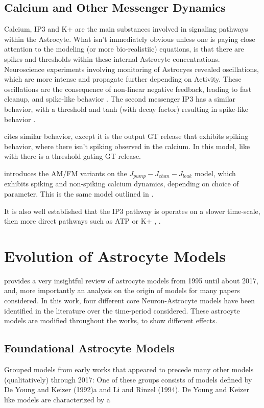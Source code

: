     \subsection{Calcium and Other Messenger Dynamics}
    Calcium, IP3 and K+ are the main substances involved in signaling pathways
    within the Astrocyte. What isn't immediately obvious unless one is paying
    close attention to the modeling (or more bio-realistiic) equations, is that
    there are spikes and thresholds within these internal Astrocyte
    concentrations. Neuroscience experiments involving monitoring of Astrocyes
    revealed oscillations, which are more intense and propagate further
    depending on Activity. These oscillations are the consequence of non-linear
    negative feedback, leading to fast cleanup, and spike-like behavior
    \cite{postnov_2009}. The second messenger IP3 has a similar behavior, with a
    threshold and tanh (with decay factor) resulting in spike-like behavior
    \cite{postnov_2009}.

    \cite{wade_2011} cites similar behavior, except it is the output GT release
    that exhibits spiking behavior, where there isn't spiking observed in the
    calcium. In this model, like with \cite{postnov_2009} there is a threshold
    gating GT release.

    \cite{pitta_2009} introduces the AM/FM variants on the $J_{pump} - J_{chan}
    - J_{leak}$ model, which exhibits spiking and non-spiking calcium dynamics,
    depending on choice of parameter. This is the same model outlined in \cite{wade_2011}.

    It is also well established that the IP3 pathway is operates
    on a slower time-scale, then more direct pathways such as ATP or K+
    \cite{postnov_2009}, \cite{bassam_2015}.


    \section{Evolution of Astrocyte Models}
    \cite{manninen_2018} provides a very insightful review of astrocyte models
    from 1995 until about 2017, and, more importantly an analysis on the origin
    of models for many papers considered. In this work, four different core
    Neuron-Astrocyte models have been identified in the literature over the
    time-period considered. These astrocyte models are modified throughout the
    works, to show different effects.

    \subsection{Foundational Astrocyte Models}
    \cite{manninen_2018} Grouped models from early works that appeared to
    precede many other models (qualitatively) through 2017: One of these groups
    consists of models defined by De Young and Keizer (1992)a and Li and Rinzel
    (1994). De Young and Keizer like models are characterized by a

